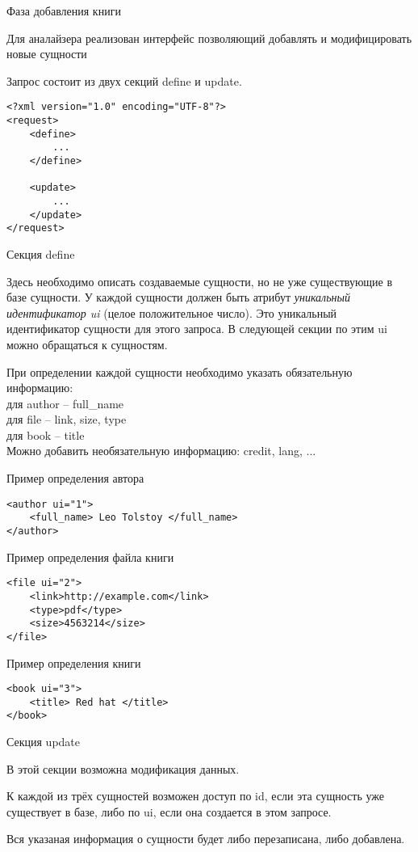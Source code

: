 Фаза добавления книги


Для аналайзера реализован интерфейс позволяющий добавлять и модифицировать новые сущности

Запрос состоит из двух секций define и update. 

\lstset{language=XML}
\begin{lstlisting}
<?xml version="1.0" encoding="UTF-8"?>
<request>
    <define>
        ...
    </define>

    <update>
        ...
    </update>
</request>
\end{lstlisting}


Секция define

Здесь необходимо описать создаваемые сущности, но не уже существующие в базе сущности. У каждой сущности должен быть атрибут {\em уникальный идентификатор ui} (целое положительное число). Это уникальный идентификатор сущности для этого запроса. В следующей секции по этим ui можно обращаться к сущностям. 

При определении каждой сущности необходимо указать обязательную информацию: \\
для author -- full\_name \\
для file -- link, size, type\\
для book -- title \\


Можно добавить необязательную информацию: credit, lang, ... 

Пример определения автора 
\begin{verbatim}
<author ui="1">
    <full_name> Leo Tolstoy </full_name>
</author>
\end{verbatim}

Пример определения файла книги 
\begin{verbatim}
<file ui="2">
    <link>http://example.com</link>
    <type>pdf</type>
    <size>4563214</size>
</file>
\end{verbatim}

Пример определения книги 
\begin{verbatim}
<book ui="3">
    <title> Red hat </title>
</book>
\end{verbatim}
Секция update

В этой секции возможна модификация данных. 

К каждой из трёх сущностей возможен доступ по id, если эта сущность уже существует в базе, либо по ui, если она создается в этом запросе. 

Вся указаная информация о сущности будет либо перезаписана, либо добавлена. 

